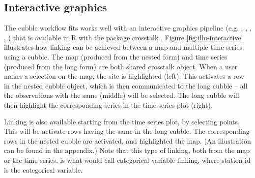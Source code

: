 \documentclass[
]{jss}
\begin{document}
\hypertarget{interactive-graphics}{%
\subsection{Interactive graphics}\label{interactive-graphics}}

The cubble workflow fits works well with an interactive graphics pipeline (e.g. \citet{buja1988elements}, \citet{buja1996interactive}, \citet{sutherland2000orca}, \citet{xie2014reactive}, \citet{cheng2016enabling}) that is available in R with the package crosstalk \citep{crosstalk}. Figure \ref{fig:illu-interactive} illustrates how linking can be achieved between a map and multiple time series using a cubble. The map (produced from the nested form) and time series (produced from the long form) are both shared crosstalk object. When a user makes a selection on the map, the site is highlighted (left). This activates a row in the nested cubble object, which is then communicated to the long cubble -- all the observations with the same  (middle) will be selected. The long cubble will then highlight the corresponding series in the time series plot (right).

Linking is also available starting from the time series plot, by selecting points. This will be activate rows having the same  in the long cubble. The corresponding rows in the nested cubble are activated, and highlighted the map. (An illustration can be found in the appendix.) Note that this type of linking, both from the map or the time series, is what \citet{CS07} would call categorical variable linking, where station id is the categorical variable.
\end{document}
